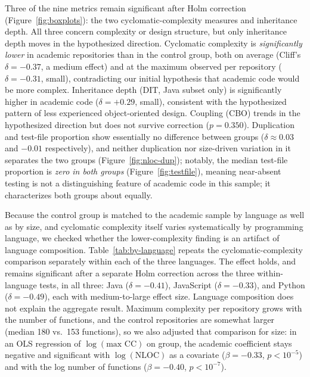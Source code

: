 \documentclass{cleiej}
\begin{document}
Three of the nine metrics remain significant after Holm correction (Figure~\ref{fig:boxplots}): the two cyclomatic-complexity measures and inheritance depth. All three concern complexity or design structure, but only inheritance depth moves in the hypothesized direction. Cyclomatic complexity is \emph{significantly lower} in academic repositories than in the control group, both on average (Cliff's $\delta=-0.37$, a medium effect) and at the maximum observed per repository ($\delta=-0.31$, small), contradicting our initial hypothesis that academic code would be more complex. Inheritance depth (DIT, Java subset only) is significantly higher in academic code ($\delta=+0.29$, small), consistent with the hypothesized pattern of less experienced object-oriented design. Coupling (CBO) trends in the hypothesized direction but does not survive correction ($p=0.350$). Duplication and test-file proportion show essentially no difference between groups ($\delta \approx 0.03$ and $-0.01$ respectively), and neither duplication nor size-driven variation in it separates the two groups (Figure~\ref{fig:nloc-dup}); notably, the median test-file proportion is \emph{zero in both groups} (Figure~\ref{fig:testfile}), meaning near-absent testing is not a distinguishing feature of academic code in this sample; it characterizes both groups about equally.

Because the control group is matched to the academic sample by language as well as by size, and cyclomatic complexity itself varies systematically by programming language, we checked whether the lower-complexity finding is an artifact of language composition. Table~\ref{tab:by-language} repeats the cyclomatic-complexity comparison separately within each of the three languages. The effect holds, and remains significant after a separate Holm correction across the three within-language tests, in all three: Java ($\delta=-0.41$), JavaScript ($\delta=-0.33$), and Python ($\delta=-0.49$), each with medium-to-large effect size. Language composition does not explain the aggregate result. Maximum complexity per repository grows with the number of functions, and the control repositories are somewhat larger (median 180 vs.\ 153 functions), so we also adjusted that comparison for size: in an OLS regression of $\log(\text{max CC})$ on group, the academic coefficient stays negative and significant with $\log(\text{NLOC})$ as a covariate ($\beta=-0.33$, $p<10^{-5}$) and with the log number of functions ($\beta=-0.40$, $p<10^{-7}$).
\end{document}
